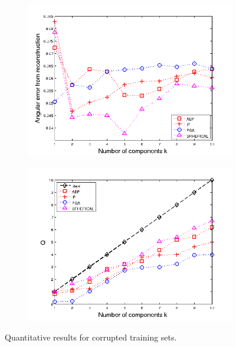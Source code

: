 \begin{figure}[t]
    \centering
    \begin{subfigure}{0.49\textwidth}
        \centering
        \includegraphics[width=1\textwidth]{statistical_normals/images/gsfs_results/reconstruction_error}
\label{fig:reconstruction-error}
    \end{subfigure}
    \begin{subfigure}{0.49\textwidth}
        \centering
        \includegraphics[width=1\textwidth]{statistical_normals/images/gsfs_results/Q}
        \label{fig:Q}
    \end{subfigure}
    \caption{Quantitative results for corrupted training sets.}
\label{fig:results-quant}
\end{figure}
